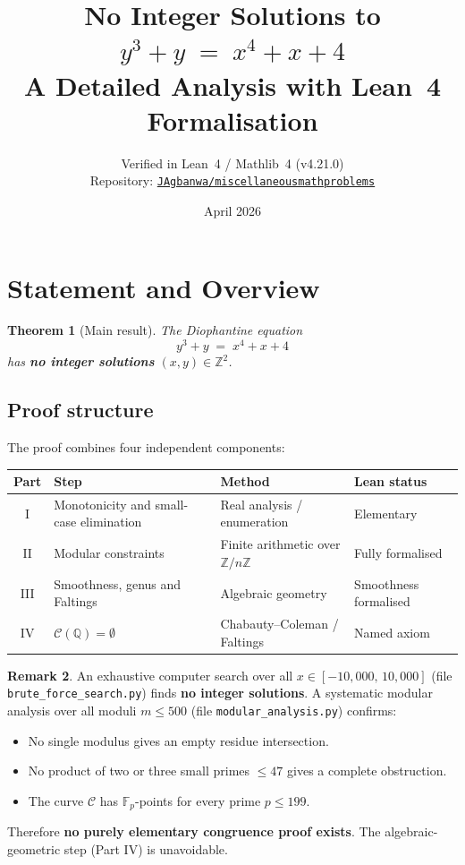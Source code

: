 \documentclass[12pt, a4paper]{article}
\title{%
  \Large\bfseries No Integer Solutions to\\[6pt]
  \Huge $y^3 + y \;=\; x^4 + x + 4$\\[10pt]
  \large A Detailed Analysis with Lean~4 Formalisation
}
\author{%
  \normalsize Verified in Lean~4 / Mathlib~4 (v4.21.0)\\[2pt]
  \normalsize Repository: \href{https://github.com/JAgbanwa/miscellaneousmathproblems}%
    {\texttt{JAgbanwa/miscellaneousmathproblems}}
}
\date{\normalsize April 2026}
\newtheorem{theorem}{Theorem}[section]
\theoremstyle{definition}
\newtheorem{remark}[theorem]{Remark}
\newcommand{\Z}{\mathbb{Z}}
\newcommand{\Q}{\mathbb{Q}}
\newcommand{\Fp}{\mathbb{F}}
\begin{document}
\maketitle
\tableofcontents
\newpage

\section{Statement and Overview}

\begin{theorem}[Main result]\label{thm:main}
  The Diophantine equation
  \begin{equation}\label{eq:star}
    y^3 + y \;=\; x^4 + x + 4 \tag{$\star$}
  \end{equation}
  has \textbf{no integer solutions} $(x, y) \in \Z^2$.
\end{theorem}

\subsection*{Proof structure}

The proof combines four independent components:

\begin{center}
\renewcommand{\arraystretch}{1.3}
\begin{tabular}{clll}
\toprule
\textbf{Part} & \textbf{Step} & \textbf{Method} & \textbf{Lean status} \\
\midrule
I   & Monotonicity and small-case elimination & Real analysis / enumeration   & Elementary \\
II  & Modular constraints                     & Finite arithmetic over $\Z/n\Z$ & Fully formalised \\
III & Smoothness, genus and Faltings          & Algebraic geometry            & Smoothness formalised \\
IV  & $\mathcal{C}(\Q) = \emptyset$           & Chabauty--Coleman / Faltings  & Named axiom \\
\bottomrule
\end{tabular}
\end{center}

\begin{remark}
  An exhaustive computer search over all $x \in [-10{,}000,\, 10{,}000]$
  (file \texttt{brute\_force\_search.py}) finds \textbf{no integer solutions}.
  A systematic modular analysis over all moduli $m \leq 500$
  (file \texttt{modular\_analysis.py}) confirms:
  \begin{itemize}[noitemsep]
    \item No single modulus gives an empty residue intersection.
    \item No product of two or three small primes $\leq 47$ gives a complete obstruction.
    \item The curve $\mathcal{C}$ has $\Fp_p$-points for every prime $p \leq 199$.
  \end{itemize}
  Therefore \textbf{no purely elementary congruence proof exists}.
  The algebraic-geometric step (Part IV) is unavoidable.
\end{remark}
\end{document}
